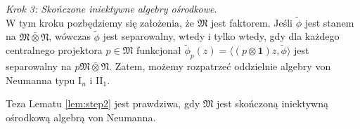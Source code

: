 {\it Krok 3: Skończone iniektywne algebry ośrodkowe}.\\
W tym kroku pozbędziemy się założenia, że $\mathfrak{M}$ jest faktorem.
Jeśli $\tilde{\phi}$ jest stanem na $\mathfrak{M} \bar{\otimes} \mathfrak{N}$,
wówczas $\tilde{\phi}$ jest separowalny,
wtedy i tylko wtedy, gdy
dla każdego centralnego projektora $p \in \mathfrak{M}$
funkcjonał
$\tilde{\phi}_{p} (z) = \langle (p \otimes \mathbf{1}) z, \tilde{\phi}\rangle$
jest separowalny na $p\mathfrak{M} \bar{\otimes} \mathfrak{N}$.
Zatem, możemy rozpatrzeć oddzielnie algebry von Neumanna
typu I$\phantom{}_{n}$ i II$\phantom{}_{1}$.
\begin{Lemma}
\label{lem:step3}
Teza Lematu \ref{lem:step2} jest prawdziwa, gdy $\mathfrak{M}$
jest skończoną iniektywną ośrodkową algebrą von Neumanna.
\end{Lemma}

